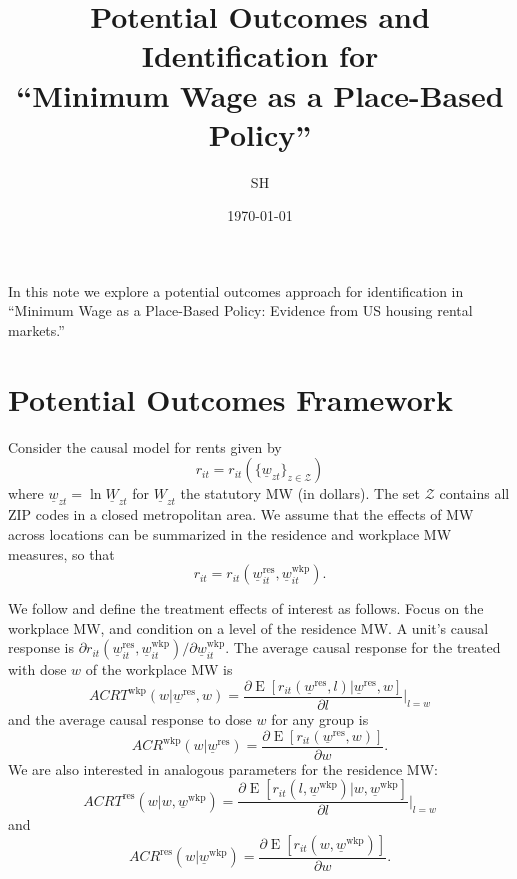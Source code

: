 \documentclass{article}
\title{Potential Outcomes and Identification for \\
       ``Minimum Wage as a Place-Based Policy''}
\author{SH}
\date{\today}
\newcommand{\Z}{\mathcal{Z}}
\newcommand{\MW}{\underline{W}}
\newcommand{\mw}{\underline{w}}
\newcommand{\wkp}{\text{wkp}}
\newcommand{\res}{\text{res}}
\DeclareMathOperator{\E}{E}
\begin{document}
\maketitle

In this note we explore a potential outcomes approach for identification in 
``Minimum Wage as a Place-Based Policy: Evidence from US housing rental markets.''

\section*{Potential Outcomes Framework}

Consider the causal model for rents given by
$$r_{it}=r_{it}(\{\mw_{zt}\}_{z\in\Z})$$
where $\mw_{zt}=\ln\MW_{zt}$ for $\MW_{zt}$ the statutory MW (in dollars).
The set $\Z$ contains all ZIP codes in a closed metropolitan area.
We assume that the effects of MW across locations can be summarized in the
residence and workplace MW measures, so that
\begin{equation}\label{eq:causal_model}
    r_{it} = r_{it}(\mw_{it}^{\res}, \mw_{it}^{\wkp}) .
\end{equation}

We follow \textcite{AngristImbens1995} and define the treatment effects of 
interest as follows.
Focus on the workplace MW, and condition on a level of the residence MW.
A unit's causal response is 
$\partial r_{it}(\mw_{it}^{\res}, \mw_{it}^{\wkp})/\partial \mw_{it}^{\wkp} .$
The average causal response for the treated with dose $w$ of the workplace MW is
\begin{equation*}
    ACRT^{\wkp}(w | \mw^{\res}, w) = \frac{\partial \E\left[r_{it}(\mw^{\res}, l)
    |                           \mw^{\res}, w\right]}{\partial l} \Big|_{l=w}
\end{equation*}
and the average causal response to dose $w$ for any group is
\begin{equation*}
    ACR^{\wkp}(w | \mw^{\res}) = \frac{\partial \E\left[r_{it}(\mw^{\res}, w) \right] }{\partial w} .
\end{equation*}
We are also interested in analogous parameters for the residence MW:
\begin{equation*}
    ACRT^{\res}(w | w, \mw^{\wkp}) = \frac{\partial \E\left[r_{it}(l, \mw^{\wkp})
    |                               w, \mw^{\wkp}\right]}{\partial l} \Big|_{l=w}
\end{equation*}
and
\begin{equation*}
    ACR^{\res}(w | \mw^{\wkp}) = \frac{\partial \E\left[r_{it}(w, \mw^{\wkp}) \right] }{\partial w} .
\end{equation*}
\end{document}
